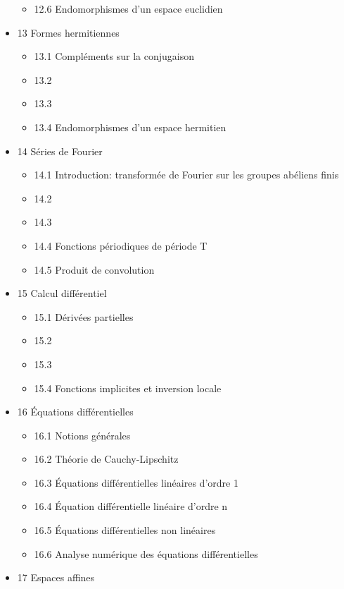 \documentclass{article}
\begin{document}
\begin{itemize}
\begin{itemize}
      \item 12.6 Endomorphismes d'un espace euclidien
    \end{itemize}
  \item 13 Formes hermitiennes
    \begin{itemize}
      \item 13.1 Compléments sur la conjugaison
      \item 13.2
      \item 13.3
      \item 13.4 Endomorphismes d'un espace hermitien
    \end{itemize}
  \item 14 Séries de Fourier
    \begin{itemize}
      \item 14.1 Introduction: transformée de Fourier sur les groupes abéliens finis
      \item 14.2
      \item 14.3
      \item 14.4 Fonctions périodiques de période T
      \item 14.5 Produit de convolution
    \end{itemize}
  \item 15 Calcul différentiel
    \begin{itemize}
      \item 15.1 Dérivées partielles
      \item 15.2
      \item 15.3
      \item 15.4 Fonctions implicites et inversion locale
    \end{itemize}
  \item 16 Équations différentielles
    \begin{itemize}
      \item 16.1 Notions générales
      \item 16.2 Théorie de Cauchy-Lipschitz
      \item 16.3 Équations différentielles linéaires d'ordre 1
      \item 16.4 Équation différentielle linéaire d'ordre n
      \item 16.5 Équations différentielles non linéaires
      \item 16.6 Analyse numérique des équations différentielles
    \end{itemize}
  \item 17 Espaces affines
    \begin{itemize}

\end{itemize}
\end{itemize}
\end{document}
